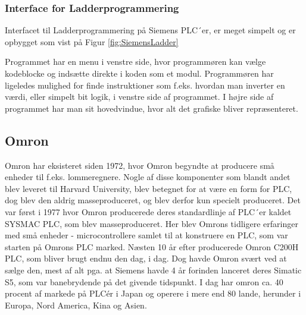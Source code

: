 \subsubsection{Interface for Ladderprogrammering}
Interfacet til Ladderprogrammering på Siemens PLC´er, er meget simpelt og er opbygget som vist på Figur \ref{fig:SiemensLadder} 


\noindent Programmet har en menu i venstre side, hvor programmøren kan vælge kodeblocke og indsætte direkte i koden som et modul.
Programmøren har ligeledes mulighed for finde instruktioner som f.eks. hvordan man inverter en værdi, eller simpelt bit logik, i venstre side af programmet.
I højre side af programmet har man sit hovedvindue, hvor alt det grafiske bliver repræsenteret.

\subsection{Omron}
Omron har eksisteret siden 1972, hvor Omron begyndte at producere små enheder til f.eks. lommeregnere. Nogle af disse komponenter som blandt andet blev leveret til Harvard University, blev betegnet for at være en form for PLC, dog blev den aldrig masseproduceret, og blev derfor kun specielt produceret.
Det var først i 1977 hvor Omron producerede deres standardlinje af PLC´er kaldet SYSMAC PLC, som blev masseproduceret. Her blev Omrons tidligere erfaringer med små enheder - microcontrollere samlet til at konstruere en PLC, som var starten på Omrons PLC marked.
Næsten 10 år efter producerede Omron C200H PLC, som bliver brugt endnu den dag, i dag. Dog havde Omron svært ved at sælge den, mest af alt pga. at Siemens havde 4 år forinden lanceret deres Simatic S5, som var banebrydende på det givende tidspunkt.
I dag har omron ca. 40 procent af markede på PLCér i Japan og operere i mere end 80 lande, herunder i Europa, Nord America, Kina og Asien.

